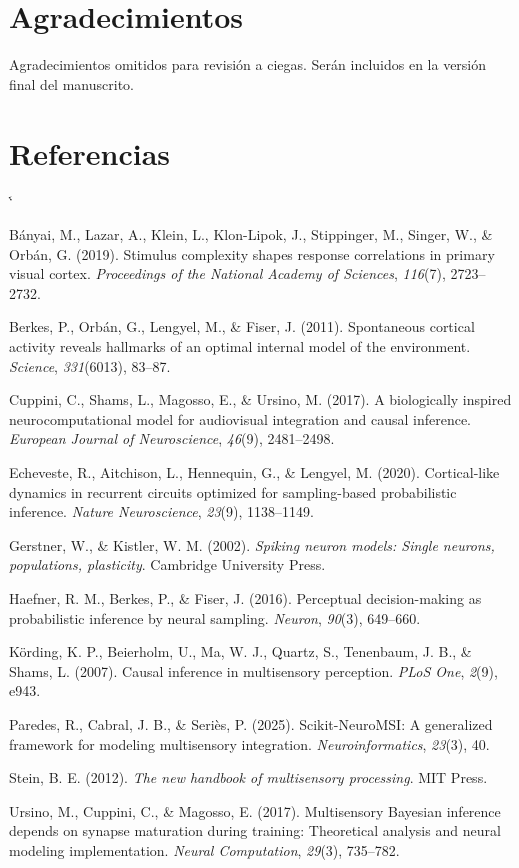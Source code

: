 \documentclass{llncs}
\makeatletter
\renewcommand{\bibsection}{\section*{Referencias}}
\renewenvironment{thebibliography}[1]{%
  \bibsection
  \list{}{%
    \setlength{\labelwidth}{0pt}%
    \setlength{\labelsep}{0pt}%
    \setlength{\leftmargin}{0pt}%
    \setlength{\itemindent}{0pt}%
    \setlength{\itemsep}{4pt plus 1pt}%
    \def\makelabel##1{}%
  }%
  \sloppy
  \sfcode`\.\@m
}{\endlist}
\makeatother
\begin{document}
\section{Agradecimientos}

Agradecimientos omitidos para revisión a ciegas. Serán incluidos en
la versión final del manuscrito.

\begin{thebibliography}{}

Bányai, M., Lazar, A., Klein, L., Klon-Lipok, J., Stippinger, M.,
Singer, W., \& Orbán, G. (2019). Stimulus complexity shapes response
correlations in primary visual cortex. \emph{Proceedings of the
National Academy of Sciences}, \emph{116}(7), 2723--2732.

Berkes, P., Orbán, G., Lengyel, M., \& Fiser, J. (2011). Spontaneous
cortical activity reveals hallmarks of an optimal internal model of
the environment. \emph{Science}, \emph{331}(6013), 83--87.

Cuppini, C., Shams, L., Magosso, E., \& Ursino, M. (2017). A
biologically inspired neurocomputational model for audiovisual
integration and causal inference. \emph{European Journal of
Neuroscience}, \emph{46}(9), 2481--2498.

Echeveste, R., Aitchison, L., Hennequin, G., \& Lengyel, M. (2020).
Cortical-like dynamics in recurrent circuits optimized for
sampling-based probabilistic inference. \emph{Nature Neuroscience},
\emph{23}(9), 1138--1149.

Gerstner, W., \& Kistler, W. M. (2002). \emph{Spiking neuron models:
Single neurons, populations, plasticity}. Cambridge University Press.

Haefner, R. M., Berkes, P., \& Fiser, J. (2016). Perceptual
decision-making as probabilistic inference by neural sampling.
\emph{Neuron}, \emph{90}(3), 649--660.

Körding, K. P., Beierholm, U., Ma, W. J., Quartz, S., Tenenbaum,
J. B., \& Shams, L. (2007). Causal inference in multisensory
perception. \emph{PLoS One}, \emph{2}(9), e943.

Paredes, R., Cabral, J. B., \& Seriès, P. (2025). Scikit-NeuroMSI: A
generalized framework for modeling multisensory integration.
\emph{Neuroinformatics}, \emph{23}(3), 40.

Stein, B. E. (2012). \emph{The new handbook of multisensory
processing}. MIT Press.

Ursino, M., Cuppini, C., \& Magosso, E. (2017). Multisensory Bayesian
inference depends on synapse maturation during training: Theoretical
analysis and neural modeling implementation. \emph{Neural
Computation}, \emph{29}(3), 735--782.

\end{thebibliography}
\end{document}
